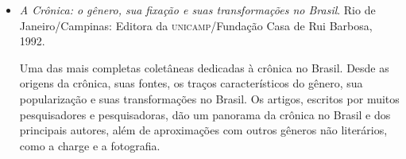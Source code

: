 \documentclass[11pt]{extarticle}
\begin{document}
\begin{itemize}
\item \emph{A Crônica: o gênero, sua fixação e suas transformações no Brasil}.
Rio de Janeiro/Campinas: Editora da \textsc{unicamp}/Fundação Casa de Rui
Barbosa, 1992. 

Uma das mais completas coletâneas dedicadas à crônica no
Brasil. Desde as origens da crônica, suas fontes, os traços
característicos do gênero, sua popularização e suas transformações no
Brasil. Os artigos, escritos por muitos pesquisadores e pesquisadoras,
dão um panorama da crônica no Brasil e dos principais autores, além de
aproximações com outros gêneros não literários, como a charge e a
fotografia.
\end{itemize}
\end{document}
